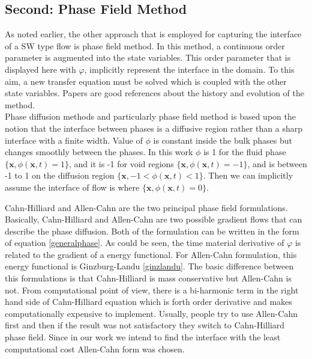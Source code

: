 \documentclass[letterpaper,10pt]{article}
\begin{document}
\subsection{Second: Phase Field Method} \label{phase field}
As noted earlier, the other approach that is employed 
for capturing the interface of a SW type flow is phase field method.
In this method, a continuous
order parameter is augmented into the state variables. This order parameter that is displayed here with $\varphi$, 
implicitly represent the interface in the domain. To this aim, a new transfer equation must be solved which is coupled with the other state variables. 
Papers \cite{Chen2002,Anderson1998,Boettinger2002,Kim2012} are good references about the history and evolution of the method.\\
Phase diffusion methods and particularly phase field method is based upon the notion that the interface between phases is a diffusive region rather than a sharp interface with a finite width. 
Value of $\phi$ is constant inside the bulk phases but changes smoothly between the phases. In this work $\phi$ is 1 for the fluid phase $ \lbrace \textbf{x}, \phi(\textbf{x},t)=1 \rbrace  $, 
and it is -1 for void regions $ \lbrace \textbf{x}, \phi(\textbf{x},t)=-1 \rbrace  $, and is between -1 to 1 on the diffusion region $ \lbrace \textbf{x}, -1 < \phi(\textbf{x},t) < 1 \rbrace  $. 
Then we can implicitly assume the interface of flow is where $ \lbrace \textbf{x}, \phi(\textbf{x},t)= 0 \rbrace  $.\newline

Cahn-Hilliard and Allen-Cahn are the two principal phase field formulations. Basically, Cahn-Hilliard and Allen-Cahn are two possible gradient flows that can describe the phase diffusion. 
Both of the formulation can be written in the form of equation \eqref{generalphase}. 
 As could be seen, the time material derivative of $\varphi$ is related to the gradient of a energy functional. For Allen-Cahn formulation, this energy functional is Ginzburg-Landu \eqref{ginzlandu}. 
The basic difference between this formulations is that
Cahn-Hilliard is mass conservative but Allen-Cahn is not. From computational point of view, there is a bi-harmonic term in the right hand side of Cahn-Hilliard equation which is forth order 
derivative and makes computationally expensive to implement. Usually, people try to use Allen-Cahn first and then if the result was not satisfactory they switch to Cahn-Hilliard phase field. 
Since in our work we intend to find the interface with the least computational cost Allen-Cahn form was chosen. 
\end{document}
